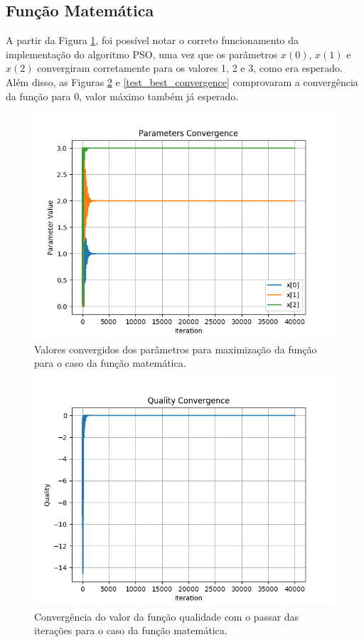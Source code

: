 \documentclass[conference]{IEEEtran}
\begin{document}
\subsection{Função Matemática}

A partir da Figura \ref{test_parameters_converge}, foi possível notar o correto funcionamento da implementação do algoritmo PSO, uma vez que os parâmetros $x(0)$, $x(1)$ e $x(2)$ convergiram corretamente para os valores 1, 2 e 3, como era esperado. Além disso, as Figuras \ref{test_quality_converge} e \ref{test_best_convergence} comprovaram a convergência da função para $0$, valor máximo também já esperado.

\begin{figure}[htbp]
\centering
\centerline{\includegraphics[scale=0.4]{test_parameters_converge.png}}
\caption{Valores convergidos dos parâmetros para maximização da função para o caso da função matemática.}
\label{test_parameters_converge}
\end{figure}

\begin{figure}[htbp]
\centering
\centerline{\includegraphics[scale=0.4]{test_quality_converge.png}}
\caption{Convergência do valor da função qualidade com o passar das iterações para o caso da função matemática.}
\label{test_quality_converge}
\end{figure} 
\end{document}

